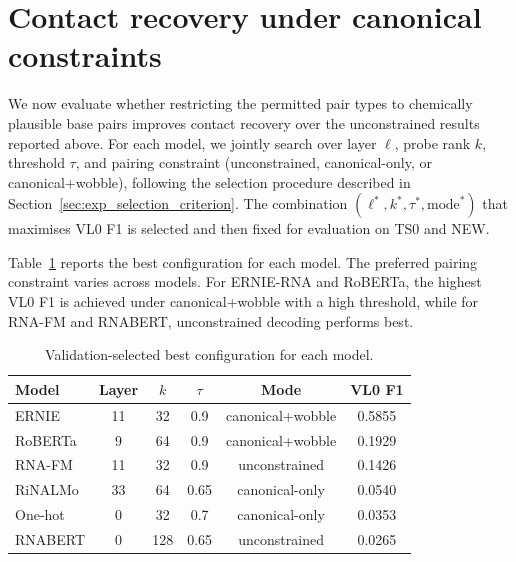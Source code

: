 \documentclass[logo,bsc,singlespacing,parskip]{infthesis}
\begin{document}
\section{Contact recovery under canonical constraints}
\label{sec:results_constraints_best}
We now evaluate whether restricting the permitted pair types to chemically plausible base pairs improves contact recovery over the unconstrained results reported above.
For each model, we jointly search over layer $\ell$, probe rank $k$, threshold $\tau$, and pairing constraint (unconstrained, canonical-only, or canonical+wobble), following the selection procedure described in Section~\ref{sec:exp_selection_criterion}. The combination $(\ell^\ast, k^\ast, \tau^\ast, \text{mode}^\ast)$ that maximises VL0 F1 is selected and then fixed for evaluation on TS0 and NEW.

Table~\ref{tab:best_config_val} reports the best configuration for each model. The preferred pairing constraint varies across models. For ERNIE-RNA and RoBERTa, the highest VL0 F1 is achieved under canonical+wobble with a high threshold, while for RNA-FM and RNABERT, unconstrained decoding performs best.

\begin{table}[H]
\centering
\caption{Validation-selected best configuration for each model.}
\label{tab:best_config_val}
\setlength{\tabcolsep}{5pt}
\begin{tabular}{lccccc}
\toprule
Model & Layer & $k$ & $\tau$ & Mode & VL0 F1 \\
\midrule
ERNIE   & 11 & 32  & 0.9  & canonical+wobble       & 0.5855 \\
RoBERTa & 9  & 64  & 0.9  & canonical+wobble       & 0.1929 \\
RNA-FM  & 11 & 32  & 0.9  & unconstrained           & 0.1426 \\
RiNALMo & 33 & 64  & 0.65 & canonical-only  & 0.0540 \\
One-hot & 0  & 32  & 0.7  & canonical-only  & 0.0353 \\
RNABERT & 0  & 128 & 0.65 & unconstrained           & 0.0265 \\
\bottomrule
\end{tabular}
\end{table}
\end{document}
